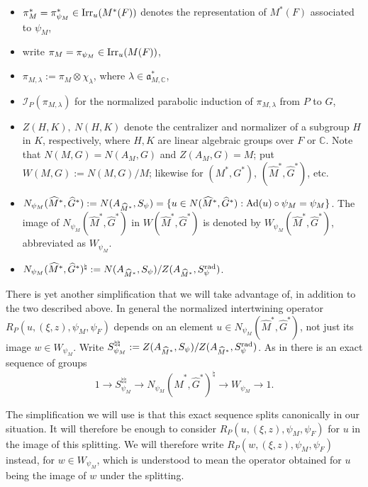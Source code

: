 \documentclass[11pt,reqno]{amsart}
\theoremstyle{plain}
\theoremstyle{definition}
\newcommand{\fka}{{\mathfrak a}}
\newcommand{\C}{\mathbb{C}}
\newcommand{\Ad}{\tu{Ad}}
\newcommand{\Irr}{\tu{Irr}}
\newcommand{\tu}{\textup}
\renewcommand{\hat}{\widehat}
\numberwithin{equation}{subsection}
\begin{document}
    \begin{itemize}
    \item $\pi^*_M = \pi^*_{\psi_M}\in  \Irr_u(M^*(F))$ denotes the representation of $M^*(F)$ associated to $\psi_M$,
    \item 
    write $\pi_M = \pi_{\psi_M} \in \Irr_u(M(F))$,
    \item $\pi_{M,\lambda}:=\pi_M\otimes \chi_\lambda$, where $\lambda\in \fka_{M,\C}^*$,
    \item $\mathcal{I}_P(\pi_{M,\lambda})$ for the normalized parabolic induction of $\pi_{M,\lambda}$ from $P$ to $G$,
    \item $Z(H,K),~N(H,K)$ denote the centralizer and normalizer of a subgroup $H$ in $K$, respectively, where $H,K$ are linear algebraic groups over $F$ or $\C$. Note that $N(M,G)=N(A_M,G)$ and $Z(A_M,G)=M$; put $W(M,G):=N(M,G)/M$; likewise for $(M^*,G^*)$, $(\hat M^*,\hat G^*)$, etc.
    \item $N_{\psi_M}(\hat M^*,\hat G^*):=N(A_{\hat M^*},S_{\psi})=\{u\in N(\hat M^*,\hat G^*):\Ad(u)\circ \psi_M = \psi_M\}$. The image of $N_{\psi_M}(\hat M^*,\hat G^*)$ in $W(\hat M^*,\hat G^*)$ is denoted by $W_{\psi_M}(\hat M^*,\hat G^*)$, abbreviated as $W_{\psi_M}$.
    \item $N_{\psi_M}(\hat M^*,\hat G^*)^\natural:=N(A_{\hat M^*},S_\psi)/Z(A_{\hat M^*},S_\psi^{\tu{rad}})$.
\end{itemize}

There is yet another simplification that we will take advantage of, in addition to the two described above. In general the normalized intertwining operator $R_P(u,(\xi,z),\psi_M,\psi_F)$ depends on an element $u \in N_{\psi_M}(\hat M^*,\hat G^*)$, not just its image $w \in W_{\psi_M}$. Write $S_{\psi_M}^{\natural\natural}:=Z(A_{\hat M^*},S_\psi)/Z(A_{\hat M^*},S^{\tu{rad}}_\psi)$. As in \cite[Diagram 2.1.1]{KMSW} there is an exact sequence of groups
\begin{equation} \label{eq:splnpsi}
    1 \to S_{\psi_M}^{\natural\natural} \to N_{\psi_M}(\hat M^*,\hat G^*)^{\natural} \to W_{\psi_M} \to 1.
\end{equation}


The simplification we will use is that this exact sequence splits canonically in our situation. It will therefore be enough to consider $R_P(u,(\xi,z),\psi_M,\psi_F)$ for $u$ in the image of this splitting. We will therefore write $R_P(w,(\xi,z),\psi_M,\psi_F)$ instead, for $w \in W_{\psi_M}$, which is understood to mean the operator obtained for $u$ being the image of $w$ under the splitting.
\end{document}
